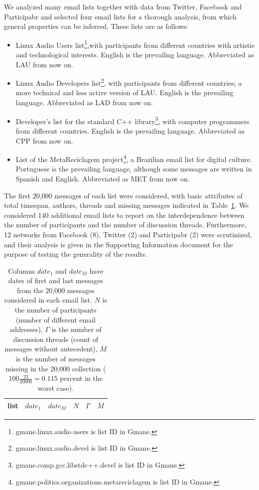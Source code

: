 \documentclass[%
aip,
jmp,%
amsmath,amssymb,
reprint,%
]{revtex4-1}
\begin{document}
We analyzed many email lists together with data from Twitter, Facebook and Participabr and selected four email lists for a thorough analysis,
from which general properties can be inferred. These lists are as follows:

\begin{itemize}
\item Linux Audio Users list\footnote{gmane.linux.audio.users is list ID in Gmane.},with participants from different countries with artistic and technological interests. English is the prevailing language. Abbreviated as LAU from now on.

\item Linux Audio Developers list\footnote{gmane.linux.audio.devel is list ID in Gmane.}, with participants from different countries; a more technical and less active version of LAU. English is the prevailing language. Abbreviated as LAD from now on.

\item Developer's list for the standard C++ library\footnote{gmane.comp.gcc.libstdc++.devel is list ID in Gmane.}, with computer programmers from different countries. English is the prevailing language. Abbreviated as CPP from now on.
\item List of the MetaReciclagem project\footnote{gmane.politics.organizations.metareciclagem is list ID in Gmane.}, a Brazilian email list for digital culture. 	Portuguese is the prevailing language, although some messages are written in Spanish and English. Abbreviated as MET from now on.
\end{itemize} 

The first 20,000 messages of each list were considered, with basic attributes of total timespan, authors, threads and missing messages indicated in Table~\ref{tab:genLists}. We considered 140 additional email lists to report on the interdependence between the number of participants and the number of discussion threads. Furthermore, 12 networks from Facebook (8), Twitter (2) and Participabr (2) were scrutinized, and their analysis is given in the Supporting Information document for the purpose of testing the generality of the results.

\begin{table}
\centering
\caption{Columns $date_1$ and $date_M$ have dates of first and last messages from the 20,000 messages considered in each email list.
$N$ is the number of participants (number of different email addresses),
$\Gamma$ is the number of discussion threads (count of messages without antecedent),
$\overline{M}$ is the number of messages missing in the 20,000 collection
($100\frac{23}{20000}=0.115$ percent in the worst case).
}
\label{tab:genLists}
\begin{tabular}{|l|c|c|c|c|c|}\hline
list & $date_1$ & $date_{M}$    & $N$  & $\Gamma$ & $\overline{M}$ \\\hline

\end{tabular}
\end{table}
\end{document}
